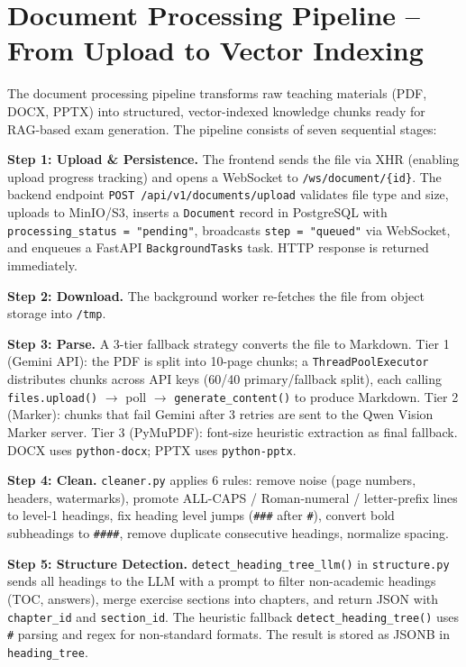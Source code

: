 \documentclass[12pt,a4paper]{article}
\begin{document}
\section{Document Processing Pipeline -- From Upload to Vector Indexing}
\label{sec:document_processing_pipeline}

The document processing pipeline transforms raw teaching materials (PDF, DOCX, PPTX) into structured, vector-indexed knowledge chunks ready for RAG-based exam generation. The pipeline consists of seven sequential stages:

\bigskip

\textbf{Step 1: Upload \& Persistence.} The frontend sends the file via XHR (enabling upload progress tracking) and opens a WebSocket to \texttt{/ws/document/\{id\}}. The backend endpoint \texttt{POST /api/v1/documents/upload} validates file type and size, uploads to MinIO/S3, inserts a \texttt{Document} record in PostgreSQL with \texttt{processing\_status = "pending"}, broadcasts \texttt{step = "queued"} via WebSocket, and enqueues a FastAPI \texttt{BackgroundTasks} task. HTTP response is returned immediately.

\bigskip

\textbf{Step 2: Download.} The background worker re-fetches the file from object storage into \texttt{/tmp}.

\bigskip

\textbf{Step 3: Parse.} A 3-tier fallback strategy converts the file to Markdown. Tier 1 (Gemini API): the PDF is split into 10-page chunks; a \texttt{ThreadPoolExecutor} distributes chunks across API keys (60/40 primary/fallback split), each calling \texttt{files.upload()} $\rightarrow$ poll $\rightarrow$ \texttt{generate\_content()} to produce Markdown. Tier 2 (Marker): chunks that fail Gemini after 3 retries are sent to the Qwen Vision Marker server. Tier 3 (PyMuPDF): font-size heuristic extraction as final fallback. DOCX uses \texttt{python-docx}; PPTX uses \texttt{python-pptx}.

\bigskip

\textbf{Step 4: Clean.} \texttt{cleaner.py} applies 6 rules: remove noise (page numbers, headers, watermarks), promote ALL-CAPS / Roman-numeral / letter-prefix lines to level-1 headings, fix heading level jumps (\texttt{###} after \texttt{#}), convert bold subheadings to \texttt{####}, remove duplicate consecutive headings, normalize spacing.

\bigskip

\textbf{Step 5: Structure Detection.} \texttt{detect\_heading\_tree\_llm()} in \texttt{structure.py} sends all headings to the LLM with a prompt to filter non-academic headings (TOC, answers), merge exercise sections into chapters, and return JSON with \texttt{chapter\_id} and \texttt{section\_id}. The heuristic fallback \texttt{detect\_heading\_tree()} uses \texttt{\#} parsing and regex for non-standard formats. The result is stored as JSONB in \texttt{heading\_tree}.
\end{document}
